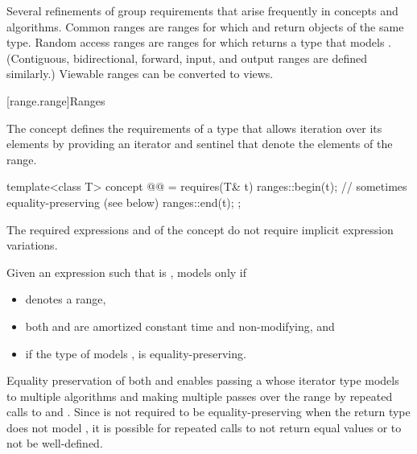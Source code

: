 \pnum
Several refinements of  group requirements
that arise frequently in concepts and algorithms.
Common ranges are ranges for which
 and 
return objects of the same type.
Random access ranges are ranges for which 
returns a type that models
.
(Contiguous, bidirectional, forward, input, and output ranges
are defined similarly.)
Viewable ranges can be converted to views.

[range.range]{Ranges}

\pnum
The  concept defines the requirements of a type that allows
iteration over its elements by providing an iterator and sentinel
that denote the elements of the range.

\begin{itemdecl}
template<class T>
  concept @@ =
    requires(T& t) {
      ranges::begin(t);         // sometimes equality-preserving (see below)
      ranges::end(t);
    };
\end{itemdecl}

\begin{itemdescr}
\pnum
The required expressions
and
of the  concept
do not require implicit expression variations.

\pnum
Given an expression  such that  is ,
 models  only if
\begin{itemize}
\item {}
  denotes a range,

\item both
and
are amortized constant time and non-modifying, and

\item if the type of  models
,  is equality-preserving.
\end{itemize}

\pnum
\begin{note}
Equality preservation of both  and
 enables passing a  whose iterator
type models  to multiple
algorithms and making multiple passes over the range by repeated calls to
 and .
Since  is not required to be equality-preserving
when the return type does not model ,
it is possible for repeated calls
to not return equal values or to not be well-defined.
\end{note}
\end{itemdescr}

